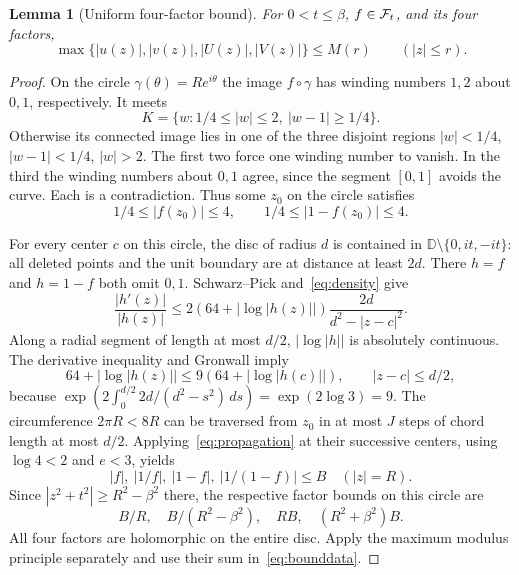 \documentclass[11pt,a4paper]{article}
\newtheorem{lemma}[theorem]{Lemma}
\theoremstyle{definition}\newtheorem{definition}[theorem]{Definition}
\theoremstyle{remark}\newtheorem{remark}[theorem]{Remark}
\newcommand{\D}{\mathbb D}\newcommand{\R}{\mathbb R}
\begin{document}
\begin{lemma}[Uniform four-factor bound]\label{lem:uniform}
For $0<t\leq\beta$, $f\in\mathcal F_t$, and its four factors,
\begin{equation}\label{eq:uniform}
 \max\{|u(z)|,|v(z)|,|U(z)|,|V(z)|\}\leq M(r)
 \qquad(|z|\leq r).
\end{equation}
\end{lemma}
\begin{proof}
On the circle $\gamma(\theta)=Re^{i\theta}$ the image $f\circ\gamma$
has winding numbers $1,2$ about $0,1$, respectively. It meets
\[
 K=\{w:1/4\leq|w|\leq2,\ |w-1|\geq1/4\}.
\]
Otherwise its connected image lies in one of the three disjoint regions
$|w|<1/4$, $|w-1|<1/4$, $|w|>2$. The first two force one winding
number to vanish. In the third the winding numbers about $0,1$ agree,
since the segment $[0,1]$ avoids the curve. Each is a contradiction.
Thus some $z_0$ on the circle satisfies
\begin{equation}\label{eq:anchor}
 1/4\leq|f(z_0)|\leq4,\qquad 1/4\leq|1-f(z_0)|\leq4.
\end{equation}

For every center $c$ on this circle, the disc of radius $d$ is contained
in $\D\setminus\{0,it,-it\}$: all deleted points and the unit boundary
are at distance at least $2d$. There $h=f$ and $h=1-f$ both omit $0,1$.
Schwarz--Pick and~\eqref{eq:density} give
\[
 \frac{|h'(z)|}{|h(z)|}
 \leq2(64+|\log|h(z)||)\frac{2d}{d^2-|z-c|^2}.
\]
Along a radial segment of length at most $d/2$, $|\log|h||$ is
absolutely continuous. The derivative inequality and Gronwall imply
\begin{equation}\label{eq:propagation}
 64+|\log|h(z)||\leq9(64+|\log|h(c)||),
 \qquad |z-c|\leq d/2,
\end{equation}
because
$\exp(2\int_0^{d/2}2d/(d^2-s^2)\,ds)=\exp(2\log3)=9$.
The circumference $2\pi R<8R$ can be traversed from $z_0$ in at most
$J$ steps of chord length at most $d/2$. Applying~\eqref{eq:propagation}
at their successive centers, using $\log4<2$ and $e<3$, yields
\[
 |f|,\ |1/f|,\ |1-f|,\ |1/(1-f)|\leq B\quad(|z|=R).
\]
Since $|z^2+t^2|\geq R^2-\beta^2$ there, the respective factor bounds
on this circle are
\begin{equation}\label{eq:fourbounds}
 B/R,\quad B/(R^2-\beta^2),\quad RB,\quad(R^2+\beta^2)B.
\end{equation}
All four factors are holomorphic on the entire disc. Apply the maximum
modulus principle separately and use their sum in~\eqref{eq:bounddata}.
\end{proof}
\end{document}
